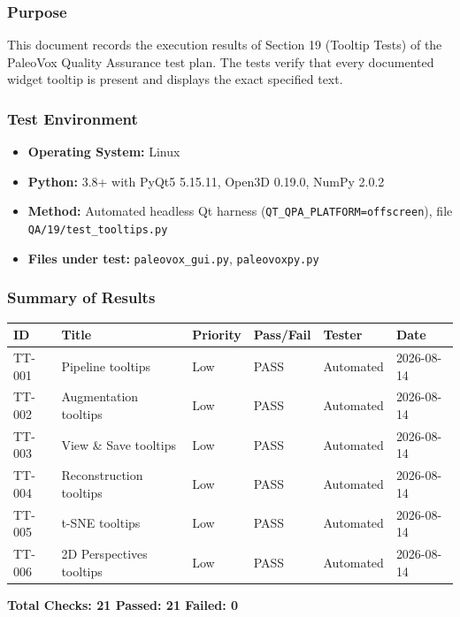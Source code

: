 \documentclass[12pt,a4paper]{article}
\begin{document}
\subsubsection{Purpose}
This document records the execution results of Section 19 (Tooltip Tests) of
the PaleoVox Quality Assurance test plan. The tests verify that every
documented widget tooltip is present and displays the exact specified text.

\subsubsection{Test Environment}
\begin{itemize}
  \item \textbf{Operating System:} Linux
  \item \textbf{Python:} 3.8+ with PyQt5 5.15.11, Open3D 0.19.0, NumPy 2.0.2
  \item \textbf{Method:} Automated headless Qt harness
    (\texttt{QT\_QPA\_PLATFORM=offscreen}), file
    \texttt{QA/19/test\_tooltips.py}
  \item \textbf{Files under test:} \texttt{paleovox\_gui.py},
    \texttt{paleovoxpy.py}
\end{itemize}

\subsubsection{Summary of Results}
\begin{longtable}{p{1.2cm}p{5.5cm}p{1.5cm}p{1.5cm}p{1.5cm}p{2cm}}
\toprule
\textbf{ID} & \textbf{Title} & \textbf{Priority} & \textbf{Pass/Fail} & \textbf{Tester} & \textbf{Date} \\
\midrule
TT-001 & Pipeline tooltips        & Low & PASS & Automated & 2026-08-14 \\
TT-002 & Augmentation tooltips    & Low & PASS & Automated & 2026-08-14 \\
TT-003 & View \& Save tooltips    & Low & PASS & Automated & 2026-08-14 \\
TT-004 & Reconstruction tooltips  & Low & PASS & Automated & 2026-08-14 \\
TT-005 & t-SNE tooltips           & Low & PASS & Automated & 2026-08-14 \\
TT-006 & 2D Perspectives tooltips & Low & PASS & Automated & 2026-08-14 \\
\bottomrule
\end{longtable}

\begin{center}
\large\textbf{Total Checks: 21 \hspace{1em} Passed: 21 \hspace{1em} Failed: 0}
\end{center}
\end{document}
